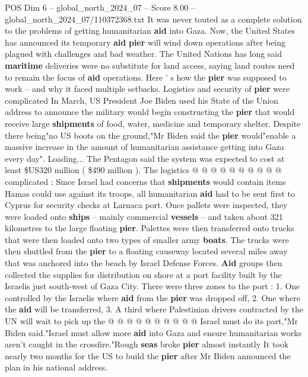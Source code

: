\begin{textsample}{POS Dim 6 – global\_north\_2024\_07 – Score 8.00 – global\_north\_2024\_07/110372368.txt}  \label{ex:f6_pos_302}
It was never touted as a complete solution to the problems of getting humanitarian \textbf{aid} into Gaza.
Now, the United States has announced its temporary \textbf{aid} \textbf{pier} will wind down operations after being plagued with challenges and bad weather.
The United Nations has long said \textbf{maritime} deliveries were no substitute for land access, saying land routes need to remain the focus of \textbf{aid} operations.
Here ' s how the \textbf{pier} was supposed to work -- and why it faced multiple setbacks.
Logistics and security of \textbf{pier} were complicated In March, US President Joe Biden used his State of the Union address to announce the military would begin constructing the \textbf{pier} that would receive large \textbf{shipments} of food, water, medicine and temporary shelter.
Despite there being"no US boots on the ground,"Mr Biden said the \textbf{pier} would"enable a massive increase in the amount of humanitarian assistance getting into Gaza every day".
Loading...
The Pentagon said the system was expected to cost at least \$US320 million ( \$490 million ).
The logistics @ @ @ @ @ @ @ @ @ @ complicated : Since Israel had concerns that \textbf{shipments} would contain items Hamas could use against its troops, all humanitarian \textbf{aid} had to be sent first to Cyprus for security checks at Larnaca port.
Once pallets were inspected, they were loaded onto \textbf{ships} -- mainly commercial \textbf{vessels} -- and taken about 321 kilometres to the large floating \textbf{pier}.
Palettes were then transferred onto trucks that were then loaded onto two types of smaller army \textbf{boats}.
The trucks were then shuttled from the \textbf{pier} to a floating causeway located several miles away that was anchored into the beach by Israel Defense Forces. \textbf{Aid} groups then collected the supplies for distribution on shore at a port facility built by the Israelis just south-west of Gaza City.
There were three zones to the port : 1.
One controlled by the Israelis where \textbf{aid} from the \textbf{pier} was dropped off, 2.
One where the \textbf{aid} will be transferred, 3.
A third where Palestinian drivers contracted by the UN will wait to pick up the @ @ @ @ @ @ @ @ @ @ Israel must do its part,"Mr Biden said."Israel must allow more \textbf{aid} into Gaza and ensure humanitarian works aren't caught in the crossfire."Rough \textbf{seas} broke \textbf{pier} almost instantly It took nearly two months for the US to build the \textbf{pier} after Mr Biden announced the plan in his national address.

\end{textsample}
